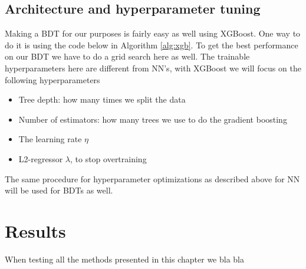 \documentclass[12pt, a4paper]{book}
\begin{document}
\subsection{Architecture and hyperparameter tuning}\label{sec:BDTGriddy}
Making a BDT for our purposes is fairly easy as well using XGBoost. One way to do it is using the code below in Algorithm \ref{alg:xgb}. 
To get the best performance on our BDT we have to do a grid search here as well. The trainable hyperparameters here are different from NN's, with XGBoost we will focus on the following hyperparameters
\begin{itemize}
   \item Tree depth: how many times we split the data
   \item Number of estimators: how many trees we use to do the gradient boosting
   \item The learning rate $\eta$
   \item L2-regressor $\lambda$, to stop overtraining
\end{itemize}
The same procedure for hyperparameter optimizations as described above for NN will be used for BDTs as well.

\section{Results}
When testing all the methods presented in this chapter we bla bla
\end{document}
